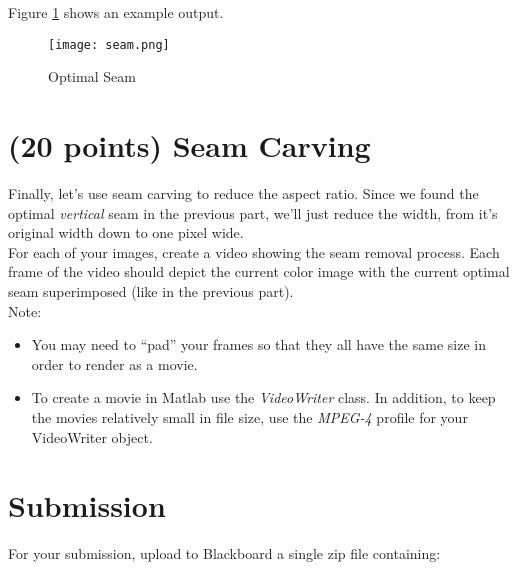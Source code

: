 \documentclass[12pt]{article}
\begin{document}
\noindent
Figure \ref{fig2} shows an example output.

\begin{figure}[H]
\begin{center}
\texttt{[image: seam.png]}
\caption{Optimal Seam}
\label{fig2}
\end{center}
\end{figure}

\newpage

\section{(20 points) Seam Carving}
Finally, let's use seam carving to reduce the aspect ratio. Since we found the optimal \emph{vertical} seam in the previous part, we'll just reduce the width, from it's original width down to one pixel wide. \\

\noindent
For each of your images, create a video showing the seam removal process.  Each frame of the video should depict the current color image with the current optimal seam superimposed (like in the previous part). \\

\noindent
Note:
\begin{itemize}
\item You may need to “pad” your frames so that they all have the same size in order to render as a movie.
\item To create a movie in Matlab use the \emph{VideoWriter} class.  In addition, to keep the movies relatively small in file size, use the \emph{MPEG-4} profile for your VideoWriter object.
\end{itemize}

\newpage
\section*{Submission}
For your submission, upload to Blackboard a single zip file containing:
\end{document}

